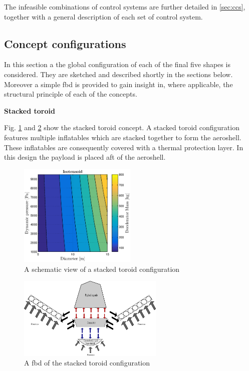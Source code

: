  The infeasible combinations of control systems are further detailed in \ref{sec:ccs}, together with a general description of each set of control system. 

\subsection{Concept configurations} \label{sec:conf}
In this section a the global configuration of each of the final five shapes is considered. They are sketched and described shortly in the sections below. Moreover a simple \gls{fbd} is provided to gain insight in, where applicable, the structural principle of each of the concepts.

\textbf{Stacked toroid}

Fig. \ref{fig:conc_stacked} and \ref{fig:fbd_stacked} show the stacked toroid concept. A stacked toroid configuration features multiple inflatables which are stacked together to form the aeroshell. These inflatables are consequently covered with a thermal protection layer. In this design the payload is placed aft of the aeroshell.\

\begin{figure}[H]
\centering
\includegraphics[width = 0.5\textwidth]{Figure/ISO_comp.eps}
\caption{A schematic view of a stacked toroid configuration}
\label{fig:conc_stacked}
\end{figure}

\begin{figure}[H]
\centering
\includegraphics[width = 0.62\textwidth]{Figure/FBD_stacked.eps}
\caption{A \gls{fbd} of the stacked toroid configuration}
\label{fig:fbd_stacked}
\end{figure}


